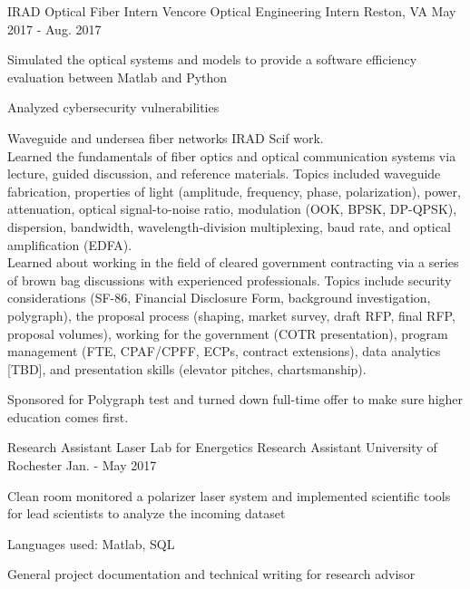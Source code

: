 \begin{cventries}
  \cventry
    {IRAD Optical Fiber Intern}
    {Vencore Optical Engineering Intern}
    {Reston, VA}
    {May 2017 - Aug. 2017}
    {
      \begin{cvitems}
        \item {Simulated the optical systems and models to provide a software efficiency evaluation between Matlab and Python}
        \item{Analyzed cybersecurity vulnerabilities }
        \item{Waveguide and undersea fiber networks IRAD Scif work. \\Learned the fundamentals of fiber optics and optical communication
    systems via lecture, guided discussion, and reference materials. Topics
    included waveguide fabrication, properties of light (amplitude,
    frequency, phase, polarization), power, attenuation, optical
    signal-to-noise ratio, modulation (OOK, BPSK, DP-QPSK), dispersion,
    bandwidth, wavelength-division multiplexing, baud rate, and optical
    amplification (EDFA). \\ Learned about working in the field of cleared government contracting
    via a series of brown bag discussions with experienced professionals.
    Topics include security considerations (SF-86, Financial Disclosure
    Form, background investigation, polygraph), the proposal process
    (shaping, market survey, draft RFP, final RFP, proposal volumes),
    working for the government (COTR presentation), program
    management (FTE, CPAF/CPFF, ECPs, contract extensions), data
    analytics [TBD], and presentation skills (elevator pitches,
    chartsmanship). }
    \item{Sponsored for Polygraph test and turned down full-time offer to make sure higher education comes first. }
      \end{cvitems}
    }

  \cventry
    {Research Assistant}
    {Laser Lab for Energetics Research Assistant}
    {University of Rochester}
    {Jan. - May 2017}
    {
      \begin{cvitems}
        \item {Clean room monitored a polarizer laser system and implemented scientific tools for lead scientists to analyze the incoming dataset}
        \item {Languages used: Matlab, SQL}
        \item {General project documentation and technical writing for research advisor}
      \end{cvitems}
    }
        

\end{cventries}
